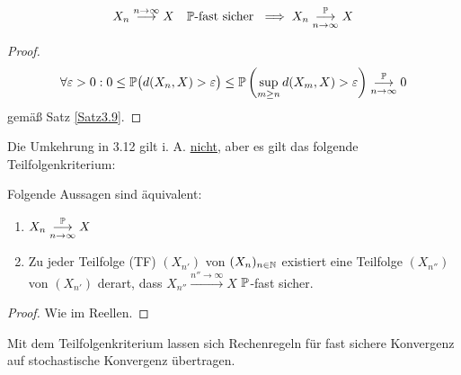 \begin{satz}\label{Satz3.12}
\begin{align*}
X_n
\stackrel{n\to\infty}{\longrightarrow}
X\quad\P\text{-fast sicher }
\implies X_n
\stackrelnew{n\to\infty}{\P}{\longrightarrow}
X
\end{align*}
\end{satz}
\begin{proof}
\begin{align*}
\forall\varepsilon>0:
0\leq\P\big(d(X_n,X)>\varepsilon\big)
\leq\P\left(\sup\limits_{m\geq n}d(X_m,X)>\varepsilon\right)
\stackrelnew{n\to\infty}{\P}{\longrightarrow}
0
\end{align*}
gemäß Satz \ref{Satz3.9}.
\end{proof}

Die Umkehrung in 3.12 gilt i. A. \underline{nicht}, aber es gilt das folgende Teilfolgenkriterium:

\begin{satz}\label{satz3.13}\enter
Folgende Aussagen sind äquivalent:
\begin{enumerate}[label=(\arabic*)]
\item $\begin{aligned}
X_n
\stackrelnew{n\to\infty}{\P}{\longrightarrow}
X\end{aligned}$
\item Zu jeder Teilfolge (TF) $(X_{n'})$ von $(X_n)_{n\in\N}$ existiert eine Teilfolge $(X_{n''})$ von $(X_{n'})$ derart, dass $X_{n''}
\stackrel{n''\to\infty}{\longrightarrow} X$ $\P$-fast sicher.
\end{enumerate}
\end{satz}
\begin{proof}
Wie im Reellen.
\end{proof}

Mit dem Teilfolgenkriterium lassen sich Rechenregeln für fast sichere Konvergenz auf stochastische Konvergenz übertragen.

